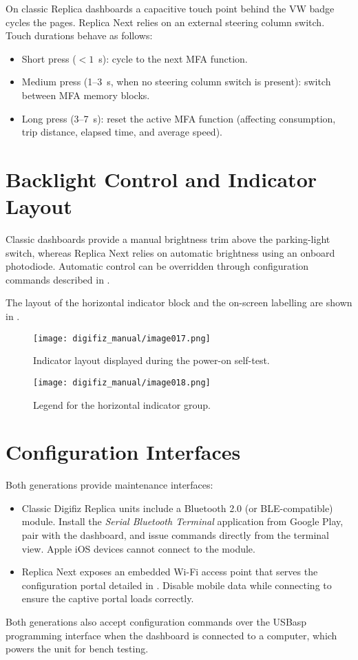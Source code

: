 On classic Replica dashboards a capacitive touch point behind the VW badge cycles the pages.
Replica Next relies on an external steering column switch.
Touch durations behave as follows:
\begin{itemize}
    \item Short press (\(<1\)~s): cycle to the next MFA function.
    \item Medium press (1--3~s, when no steering column switch is present): switch between MFA memory blocks.
    \item Long press (3--7~s): reset the active MFA function (affecting consumption, trip distance, elapsed time, and average speed).
\end{itemize}

\section{Backlight Control and Indicator Layout}

Classic dashboards provide a manual brightness trim above the parking-light switch, whereas Replica Next relies on automatic brightness using an onboard photodiode.
Automatic control can be overridden through configuration commands described in .

The layout of the horizontal indicator block and the on-screen labelling are shown in .

\begin{figure}[htbp]
    \centering
    \texttt{[image: digifiz\_manual/image017.png]}
    \caption{Indicator layout displayed during the power-on self-test.}
    \label{fig:indicator-layout}
\end{figure}

\begin{figure}[htbp]
    \centering
    \texttt{[image: digifiz\_manual/image018.png]}
    \caption{Legend for the horizontal indicator group.}
    \label{fig:indicator-legend}
\end{figure}

\section{Configuration Interfaces}

Both generations provide maintenance interfaces:
\begin{itemize}
    \item Classic Digifiz Replica units include a Bluetooth 2.0 (or BLE-compatible) module.
          Install the \emph{Serial Bluetooth Terminal} application from Google Play, pair with the dashboard, and issue commands directly from the terminal view.
          Apple iOS devices cannot connect to the module.
    \item Replica Next exposes an embedded Wi-Fi access point that serves the configuration portal detailed in .
          Disable mobile data while connecting to ensure the captive portal loads correctly.
\end{itemize}

Both generations also accept configuration commands over the USBasp programming interface when the dashboard is connected to a computer, which powers the unit for bench testing.
